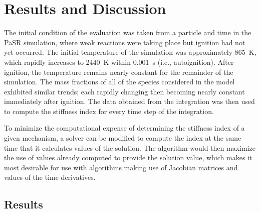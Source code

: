 \documentclass[12pt]{ussci}
\begin{document}
\section{Results and Discussion}
The initial condition of the evaluation was taken from a particle and time in the PaSR simulation, where weak reactions were taking place but ignition had not yet occurred.
The initial temperature of the simulation was approximately \SI{865}{\kelvin}, which rapidly increases to \SI{2440}{\kelvin} within \SI{0.001}{\second} (i.e., autoignition).
After ignition, the temperature remains nearly constant for the remainder of the simulation. The mass fractions of all of the species considered in the model exhibited similar trends; each rapidly changing then becoming nearly constant immediately after ignition.
The data obtained from the integration was then used to compute the stiffness index for every time step of the integration.

To minimize the computational expense of determining the stiffness index of a given mechanism, a solver can be modified to compute the index at the same time that it calculates values of the solution.
The algorithm would then maximize the use of values already computed to provide the solution value, which makes it most desirable for use with algorithms making use of Jacobian matrices and values of the time derivatives.

\subsection{Results}
\end{document}
